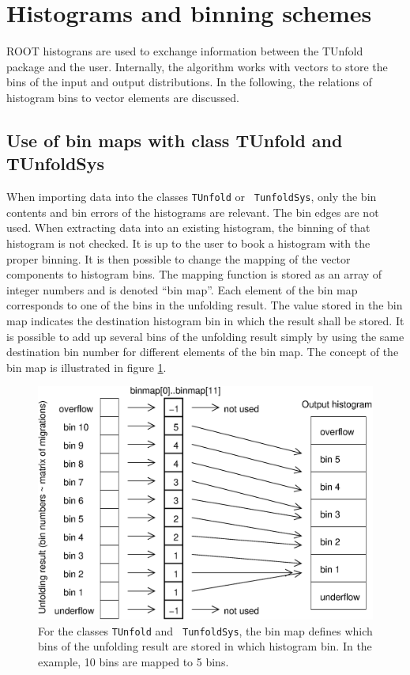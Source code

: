 \documentclass[12pt]{article}
\newlength{\figwidth}
\begin{document}
\section{Histograms and binning schemes}

ROOT histograns are used to exchange information between the TUnfold
package and the user. Internally, the algorithm works with vectors to
store the bins of the input and output distributions. In the
following, the relations of histogram bins to vector elements are discussed.

\subsection{Use of  bin maps with class TUnfold and TUnfoldSys}

When importing data into the classes {\tt TUnfold} or {\tt
  TunfoldSys}, only the bin contents and bin errors of the histograms
are relevant. The bin edges are not used.
When extracting data into an existing histogram, the binning of
that histogram is not checked. It is up to the user to book a histogram
with the proper binning. It is then possible to change
the mapping of the vector components to histogram bins. The mapping
function is stored as an array of integer numbers and is denoted
``bin map''. Each element of the bin map corresponds to one of the bins
in the unfolding result. The value stored in the bin map indicates the
destination histogram bin in which the result shall be stored. It is
possible to add up several bins of the unfolding result simply by
using the same destination bin number for different elements of the
bin map. The concept of the bin map is illustrated in figure \ref{fig:binmap}.
\begin{figure}
\begin{center}
\includegraphics[width=0.7\figwidth]{fig/tunfold_manual_fig1.eps}
\end{center}
\caption{\label{fig:binmap} For the classes {\tt TUnfold} and {\tt
  TunfoldSys}, the bin map defines which bins of the unfolding result
are stored in which histogram bin. In the example, 10 bins are mapped
to 5 bins.}
\end{figure}
\end{document}
